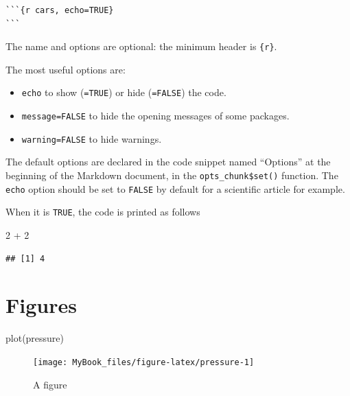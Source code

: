 \documentclass[
  12pt,
  american,
  a4paper,
  extrafontsizes,onecolumn,openright
  ]{memoir}
\newenvironment{Shaded}{\begin{snugshade}}{\end{snugshade}}
\newcommand{\DecValTok}[1]{\textcolor[rgb]{0.00,0.00,0.81}{#1}}
\newcommand{\FunctionTok}[1]{\textcolor[rgb]{0.00,0.00,0.00}{#1}}
\newcommand{\NormalTok}[1]{#1}
\newcommand{\SpecialCharTok}[1]{\textcolor[rgb]{0.00,0.00,0.00}{#1}}
\providecommand{\tightlist}{%
  \setlength{\itemsep}{0pt}\setlength{\parskip}{0pt}}
\begin{document}
\begin{verbatim}
```{r cars, echo=TRUE}
```
\end{verbatim}

The name and options are optional: the minimum header is \texttt{\{r\}}.

The most useful options are:

\begin{itemize}
\tightlist
\item
  \texttt{echo} to show (\texttt{=TRUE}) or hide (\texttt{=FALSE}) the code.
\item
  \texttt{message=FALSE} to hide the opening messages of some packages.
\item
  \texttt{warning=FALSE} to hide warnings.
\end{itemize}

The default options are declared in the code snippet named \enquote{Options} at the beginning of the Markdown document, in the \texttt{opts\_chunk\$set()} function.
The \texttt{echo} option should be set to \texttt{FALSE} by default for a scientific article for example.

When it is \texttt{TRUE}, the code is printed as follows

\scriptsize

\begin{Shaded}
\begin{Highlighting}[]
\DecValTok{2} \SpecialCharTok{+} \DecValTok{2}
\end{Highlighting}
\end{Shaded}

\begin{verbatim}
## [1] 4
\end{verbatim}

\normalsize

\hypertarget{figures}{%
\section{Figures}\label{figures}}

\scriptsize

\begin{Shaded}
\begin{Highlighting}[]
\FunctionTok{plot}\NormalTok{(pressure)}
\end{Highlighting}
\end{Shaded}

\begin{figure}

{\centering \texttt{[image: MyBook\_files/figure-latex/pressure-1]} 

}

\caption{A figure}\label{fig:pressure}
\end{figure}
\end{document}
